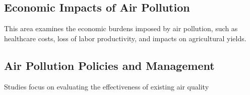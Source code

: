 \documentclass[12pt]{article}
\begin{document}
\subsection{Economic Impacts of Air Pollution}
This area examines the economic burdens imposed by air pollution, such as healthcare costs, loss of labor productivity, and impacts on agricultural yields.

\subsection{Air Pollution Policies and Management}
Studies focus on evaluating the effectiveness of existing air quality





\newpage

\printbibliography
\end{document}
